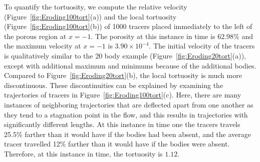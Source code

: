 \documentclass[preprint, 10pt]{elsarticle}
\begin{document}
To quantify the tortuosity, we compute the relative velocity
(Figure~\ref{fig:Eroding100tort}(a)) and the local tortuosity
(Figure~\ref{fig:Eroding100tort}(b)) of 1000 tracers placed immediately
to the left of the porous region at $x=-1$.  The porosity at this
instance in time is $62.98\%$ and the maximum velocity at $x=-1$ is
$3.90 \times 10^{-4}$. The initial velocity of the tracers is
qualitatively similar to the 20 body example
(Figure~\ref{fig:Eroding20tort}(a)), except with additional maximum and
minimums because of the additional bodies.  Compared to
Figure~\ref{fig:Eroding20tort}(b), the local tortuosity is much more
discontinuous.  These discontinuities can be explained by examining the
trajectories of tracers in Figure~\ref{fig:Eroding100tort}(c).  Here,
there are many instances of neighboring trajectories that are deflected
apart from one another as they tend to a stagnation point in the flow,
and this results in trajectories with significantly different lengths.
At this instance in time one the tracers travels 25.5\% farther than it
would have if the bodies had been absent, and the average tracer
travelled 12\% farther than it would have if the bodies were absent.
Therefore, at this instance in time, the tortuosity is $1.12$.
\end{document}
